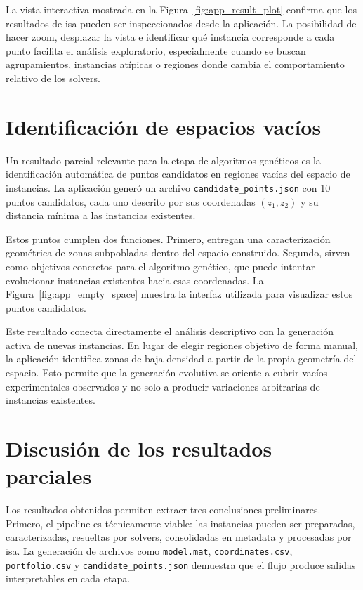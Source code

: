 La vista interactiva mostrada en la Figura~\ref{fig:app_result_plot} confirma que los
resultados de \acrshort{isa} pueden ser inspeccionados desde la aplicación.
La posibilidad de hacer zoom, desplazar la vista e identificar qué instancia
corresponde a cada punto facilita el análisis exploratorio, especialmente cuando se
buscan agrupamientos, instancias atípicas o regiones donde cambia el comportamiento
relativo de los solvers.

\section{Identificación de espacios vacíos}
\label{sec:resultados_espacios_vacios}

Un resultado parcial relevante para la etapa de algoritmos genéticos es la
identificación automática de puntos candidatos en regiones vacías del espacio de
instancias.
La aplicación generó un archivo \texttt{candidate\_points.json} con 10 puntos
candidatos, cada uno descrito por sus coordenadas $(z_1,z_2)$ y su distancia mínima a
las instancias existentes.

Estos puntos cumplen dos funciones.
Primero, entregan una caracterización geométrica de zonas subpobladas dentro del
espacio construido.
Segundo, sirven como objetivos concretos para el algoritmo genético, que puede intentar
evolucionar instancias existentes hacia esas coordenadas.
La Figura~\ref{fig:app_empty_space} muestra la interfaz utilizada para visualizar
estos puntos candidatos.

Este resultado conecta directamente el análisis descriptivo con la generación activa
de nuevas instancias.
En lugar de elegir regiones objetivo de forma manual, la aplicación identifica zonas
de baja densidad a partir de la propia geometría del espacio.
Esto permite que la generación evolutiva se oriente a cubrir vacíos experimentales
observados y no solo a producir variaciones arbitrarias de instancias existentes.

\section{Discusión de los resultados parciales}
\label{sec:resultados_discusion}

Los resultados obtenidos permiten extraer tres conclusiones preliminares.
Primero, el pipeline es técnicamente viable: las instancias pueden ser preparadas,
caracterizadas, resueltas por solvers, consolidadas en metadata y procesadas por
\acrshort{isa}.
La generación de archivos como \texttt{model.mat}, \texttt{coordinates.csv},
\texttt{portfolio.csv} y \texttt{candidate\_points.json} demuestra que el flujo
produce salidas interpretables en cada etapa.

